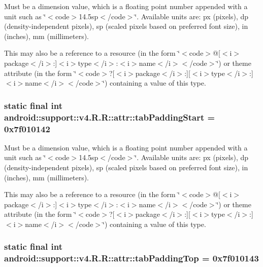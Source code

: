 Must be a dimension value, which is a floating point number appended with a unit such as \char`\"{}$<$code$>$14.5sp$<$/code$>$\char`\"{}. Available units are: px (pixels), dp (density-independent pixels), sp (scaled pixels based on preferred font size), in (inches), mm (millimeters). 

This may also be a reference to a resource (in the form \char`\"{}$<$code$>$@\mbox{[}$<$i$>$package$<$/i$>$:\mbox{]}$<$i$>$type$<$/i$>$:$<$i$>$name$<$/i$>$$<$/code$>$\char`\"{}) or theme attribute (in the form \char`\"{}$<$code$>$?\mbox{[}$<$i$>$package$<$/i$>$:\mbox{]}\mbox{[}$<$i$>$type$<$/i$>$:\mbox{]}$<$i$>$name$<$/i$>$$<$/code$>$\char`\"{}) containing a value of this type. \hypertarget{classandroid_1_1support_1_1v4_1_1_r_1_1attr_78a6b497af5c077a5222e8ce8bf7d618}{
\subsubsection[{tabPaddingStart}]{\setlength{\rightskip}{0pt plus 5cm}static final int android::support::v4.R.R::attr::tabPaddingStart = 0x7f010142}}
\label{classandroid_1_1support_1_1v4_1_1_r_1_1attr_78a6b497af5c077a5222e8ce8bf7d618}


Must be a dimension value, which is a floating point number appended with a unit such as \char`\"{}$<$code$>$14.5sp$<$/code$>$\char`\"{}. Available units are: px (pixels), dp (density-independent pixels), sp (scaled pixels based on preferred font size), in (inches), mm (millimeters). 

This may also be a reference to a resource (in the form \char`\"{}$<$code$>$@\mbox{[}$<$i$>$package$<$/i$>$:\mbox{]}$<$i$>$type$<$/i$>$:$<$i$>$name$<$/i$>$$<$/code$>$\char`\"{}) or theme attribute (in the form \char`\"{}$<$code$>$?\mbox{[}$<$i$>$package$<$/i$>$:\mbox{]}\mbox{[}$<$i$>$type$<$/i$>$:\mbox{]}$<$i$>$name$<$/i$>$$<$/code$>$\char`\"{}) containing a value of this type. \hypertarget{classandroid_1_1support_1_1v4_1_1_r_1_1attr_9d331931d68e20f43f550fdbb918f7e9}{
\subsubsection[{tabPaddingTop}]{\setlength{\rightskip}{0pt plus 5cm}static final int android::support::v4.R.R::attr::tabPaddingTop = 0x7f010143}}
\label{classandroid_1_1support_1_1v4_1_1_r_1_1attr_9d331931d68e20f43f550fdbb918f7e9}


